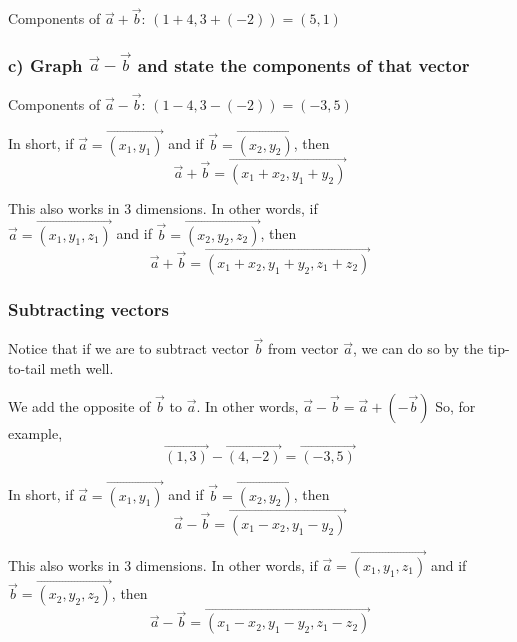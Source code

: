 \documentclass{article}
\begin{document}
Components of $\vec{a}+\vec{b}$: $(1+4, 3+(-2)) = (5, 1)$

\subsubsection*{c) Graph $\vec{a}-\vec{b}$ and state the components of that vector}

\begin{center}
\end{center}

Components of $\vec{a}-\vec{b}$: $(1-4, 3-(-2)) = (-3, 5)$
\begin{tcolorbox}[enhanced,frame style image=blueshade.png,
  opacityback=0.75,opacitybacktitle=0.25,
  colback=blue!5!white,colframe=blue!75!black]
In short, if $\vec{a}=\overrightarrow{\left(x_1, y_1\right)}$ and if $\vec{b}=\overrightarrow{\left(x_2, y_2\right)}$, then
$$
\vec{a}+\vec{b}=\overrightarrow{\left(x_1+x_2, y_1+y_2\right)}
$$

This also works in 3 dimensions. In other words, if\\
$\vec{a}=\overrightarrow{(x_1,y_1,z_1)}$ and if $\vec{b}=\overrightarrow{(x_2,y_2,z_2)}$, then 
$$\vec{a}+\vec{b}=\overrightarrow{(x_1+x_2,y_1+y_2,z_1+z_2)}$$
\end{tcolorbox}

\subsubsection{Subtracting vectors} Notice that if we are to subtract vector $\vec{b}$ from vector $\vec{a}$, we can do so by the tip-to-tail meth well.

We add the opposite of $\vec{b}$ to $\vec{a}$. In other words, $\vec{a}-\vec{b}=\vec{a}+(-\vec{b})$
So, for example,
$$
\overrightarrow{(1,3)}-\overrightarrow{(4,-2)}=\overrightarrow{(-3,5)}
$$
\begin{tcolorbox}[enhanced,frame style image=blueshade.png,
  opacityback=0.75,opacitybacktitle=0.25,
  colback=blue!5!white,colframe=purple!75!black]
In short, if $\vec{a}=\overrightarrow{\left(x_1, y_1\right)}$ and if $\vec{b}=\overrightarrow{\left(x_2, y_2\right)}$, then
$$
\vec{a}-\vec{b}=\overrightarrow{\left(x_1-x_2, y_1-y_2\right)}
$$

This also works in 3 dimensions. In other words, if $\vec{a}=\overrightarrow{\left(x_1, y_1, z_1\right)}$ and if $\vec{b}=\overrightarrow{\left(x_2, y_2, z_2\right)}$, then
$$
\vec{a}-\vec{b}=\overrightarrow{\left(x_1-x_2, y_1-y_2, z_1-z_2\right)}
$$
\end{tcolorbox}
\end{document}
